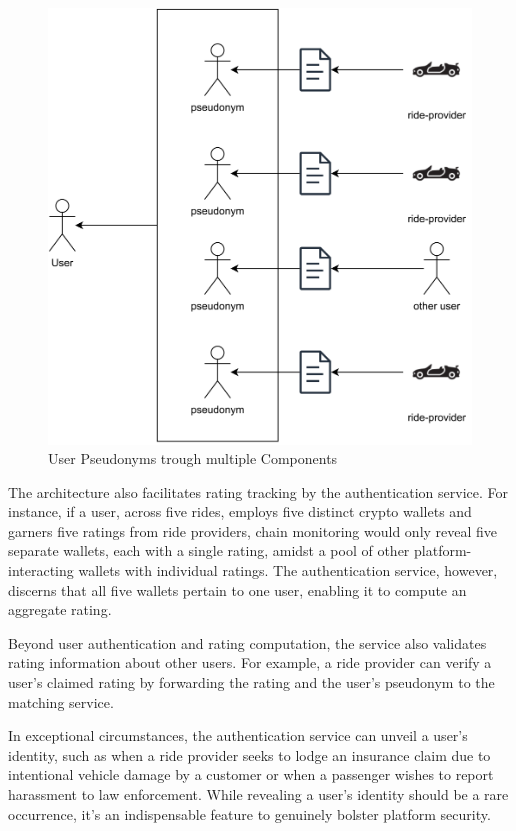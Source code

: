 \begin{figure}[h]
    \centering
    \includegraphics[height=0.40\textheight]{data/2.svg}
    \caption{User Pseudonyms trough multiple Components}
    \label{fig:directSVG}
\end{figure}


The architecture also facilitates rating tracking by the authentication service. For instance, if a user, across five rides, employs five distinct crypto wallets and garners five ratings from ride providers, chain monitoring would only reveal five separate wallets, each with a single rating, amidst a pool of other platform-interacting wallets with individual ratings. The authentication service, however, discerns that all five wallets pertain to one user, enabling it to compute an aggregate rating.

Beyond user authentication and rating computation, the service also validates rating information about other users. For example, a ride provider can verify a user's claimed rating by forwarding the rating and the user's pseudonym to the matching service. 

In exceptional circumstances, the authentication service can unveil a user's identity, such as when a ride provider seeks to lodge an insurance claim due to intentional vehicle damage by a customer or when a passenger wishes to report harassment to law enforcement. While revealing a user's identity should be a rare occurrence, it's an indispensable feature to genuinely bolster platform security.

